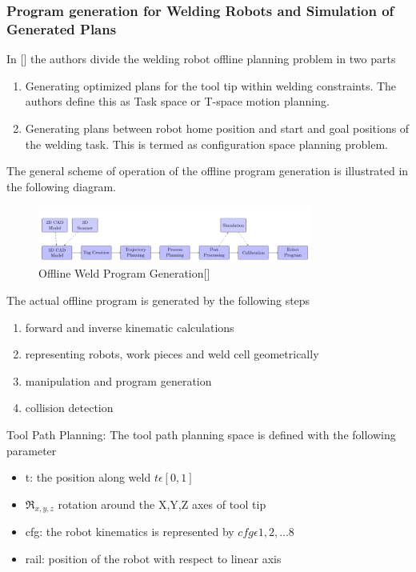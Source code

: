 \subsubsection{Program generation for Welding Robots and Simulation of Generated Plans}
In [\citet{Larkin2016}] the authors divide the welding robot offline planning problem in two parts
\begin{enumerate}
\item Generating optimized plans for the tool tip within welding constraints. The authors define this as Task space or T-space motion planning.
\item Generating plans between robot home position and start and goal positions of the welding task. This is termed as configuration space planning problem.
\end{enumerate}
The general scheme of operation of the offline program generation is illustrated in the following diagram.
\begin{figure}[htbp] %
 \centering
   \includegraphics[width=9cm]{images/cadgen_model.png}
   \caption[Offline Weld Program Generation]
   {Offline Weld Program Generation[\citet{Larkin2016}]}  
\label{fig:img7}
\end{figure}
\newpage
The actual offline program is generated by the following steps
\begin{enumerate}
\item forward and inverse kinematic calculations
\item representing robots, work pieces and weld cell geometrically
\item manipulation and program generation
\item collision detection
\end{enumerate}
Tool Path Planning: The tool path planning space is defined with the following parameter
\begin{itemize}
\item t: the position along weld $t \epsilon [0,1]$
\item $\Re_{x,y,z} $ rotation around the X,Y,Z axes of tool tip
\item cfg: the robot kinematics is represented by $cfg \epsilon {1,2,...8}$
\item rail: position of the robot with respect to linear axis 
\end{itemize}
